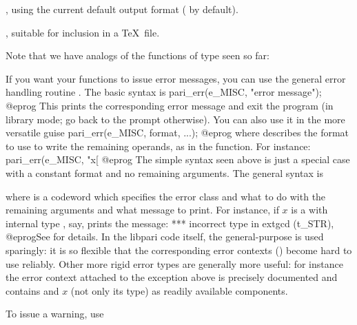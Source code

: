 , using the current default output format
( by default).

, suitable for inclusion in a \TeX\ file.


Note that we have  analogs of the functions of  type
seen so far:





\noindent
If you want your functions to issue error messages, you can use the general
error handling routine . The basic syntax is
%
\bprog
  pari_err(e_MISC, "error message");
@eprog\noindent
This prints the corresponding error message and exit the program (in
library mode; go back to the  prompt otherwise).\label{se:err} You can
also use it in the more versatile guise
\bprog
  pari_err(e_MISC, format, ...);
@eprog\noindent
where  describes the format to use to write the remaining
operands, as in the  function. For instance:
\bprog
  pari_err(e_MISC, "x[%
@eprog\noindent
The simple syntax seen above is just a special case with a constant format
and no remaining arguments. The general syntax is


\noindent where  is a codeword which specifies the error class
and what to do with the remaining arguments and what message to print.
For instance, if $x$ is a  with internal type , say,
 prints the message:
\bprog
    ***   incorrect type in extgcd (t_STR),
@eprog\noindent See  for details. In the libpari code
itself, the general-purpose  is used sparingly: it is so
flexible that the corresponding error contexts () become hard to
use reliably. Other more rigid error types are generally more useful: for
instance the error context attached to the  exception above is
precisely documented and contains  and $x$ (not only its type)
as readily available components.


\noindent To issue a warning, use

